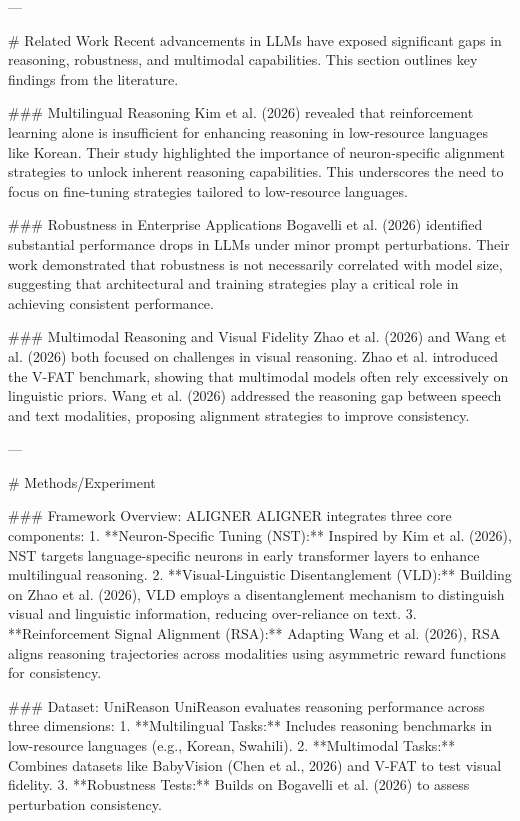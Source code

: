---

# Related Work
Recent advancements in LLMs have exposed significant gaps in reasoning, robustness, and multimodal capabilities. This section outlines key findings from the literature.

### Multilingual Reasoning
Kim et al. (2026) revealed that reinforcement learning alone is insufficient for enhancing reasoning in low-resource languages like Korean. Their study highlighted the importance of neuron-specific alignment strategies to unlock inherent reasoning capabilities. This underscores the need to focus on fine-tuning strategies tailored to low-resource languages.

### Robustness in Enterprise Applications
Bogavelli et al. (2026) identified substantial performance drops in LLMs under minor prompt perturbations. Their work demonstrated that robustness is not necessarily correlated with model size, suggesting that architectural and training strategies play a critical role in achieving consistent performance.

### Multimodal Reasoning and Visual Fidelity
Zhao et al. (2026) and Wang et al. (2026) both focused on challenges in visual reasoning. Zhao et al. introduced the V-FAT benchmark, showing that multimodal models often rely excessively on linguistic priors. Wang et al. (2026) addressed the reasoning gap between speech and text modalities, proposing alignment strategies to improve consistency.

---

# Methods/Experiment

### Framework Overview: ALIGNER
ALIGNER integrates three core components:
1. **Neuron-Specific Tuning (NST):** Inspired by Kim et al. (2026), NST targets language-specific neurons in early transformer layers to enhance multilingual reasoning.
2. **Visual-Linguistic Disentanglement (VLD):** Building on Zhao et al. (2026), VLD employs a disentanglement mechanism to distinguish visual and linguistic information, reducing over-reliance on text.
3. **Reinforcement Signal Alignment (RSA):** Adapting Wang et al. (2026), RSA aligns reasoning trajectories across modalities using asymmetric reward functions for consistency.

### Dataset: UniReason
UniReason evaluates reasoning performance across three dimensions:
1. **Multilingual Tasks:** Includes reasoning benchmarks in low-resource languages (e.g., Korean, Swahili).
2. **Multimodal Tasks:** Combines datasets like BabyVision (Chen et al., 2026) and V-FAT to test visual fidelity.
3. **Robustness Tests:** Builds on Bogavelli et al. (2026) to assess perturbation consistency.

